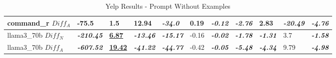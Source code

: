 \documentclass[11pt]{article}
\begin{document}
\begin{table}[ht]
{\begin{tabular}{lllllllllll}
            command\_r $Diff_A$  & -75.5                     & 1.5                        & 12.94                    & \textbf{\textit{-34.0}}  & 0.19      & \textbf{\textit{-0.12}} & \textbf{\textit{-2.76}} & 2.83                    & \textbf{\textit{-20.49}}   & \textbf{\textit{-4.76}}  \\ \midrule
            llama3\_70b $Diff_N$ & \textbf{\textit{-210.45}} & \textbf{\underline{6.87}}  & \textbf{\textit{-13.46}} & \textbf{\textit{-15.17}} & -0.16     & \textbf{\textit{-0.02}} & \textbf{\textit{-1.78}} & \textbf{\textit{-1.31}} & 3.7                        & \textbf{\textit{-1.58}}  \\ \midrule
            llama3\_70b $Diff_A$ & \textbf{\textit{-607.52}} & \textbf{\underline{19.42}} & \textbf{\textit{-41.22}} & \textbf{\textit{-44.77}} & -0.42     & \textbf{\textit{-0.05}} & \textbf{\textit{-5.48}} & \textbf{\textit{-4.34}} & 9.79                       & \textbf{\textit{-4.98}}  \\ \bottomrule
        \end{tabular}%
    }
    \caption{Yelp Results - Prompt Without Examples}\label{table-prompt-1-yelp} %
\end{table}
\end{document}

